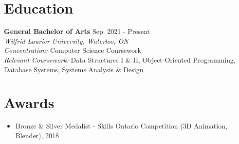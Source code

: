 \documentclass[a4paper,10pt]{article}
\begin{document}
\section*{Education}
\textbf{General Bachelor of Arts} \hfill Sep. 2021 - Present \\
\textit{Wilfrid Laurier University, Waterloo, ON} \\
\textit{Concentration:} Computer Science Coursework \\
\textit{Relevant Coursework:} Data Structures I \& II, Object-Oriented Programming, Database Systems, Systems Analysis \& Design

\section*{Awards}
\begin{itemize}
    \item Bronze \& Silver Medalist - Skills Ontario Competition (3D Animation, Blender), 2018
\end{itemize}
\end{document}
